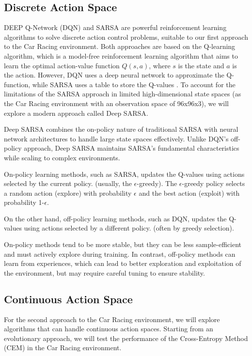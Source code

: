 \documentclass[../CSC_52081_EP.tex]{subfiles}
\begin{document}
    \subsection{Discrete Action Space}

    DEEP Q-Network (DQN) and SARSA are powerful reinforcement learning algorithms to solve discrete action control problems, suitable to our first approach to the Car Racing environment.
    Both approaches are based on the Q-learning algorithm, which is a model-free reinforcement learning algorithm that aims to learn the optimal action-value function $Q(s, a)$, where $s$ is the state and $a$ is the action.
    However, DQN uses a deep neural network to approximate the Q-function, while SARSA uses a table to store the Q-values \cite{Popular_RL}. To account for the limitations of the SARSA approach in limited high-dimensional state spaces (as the Car Racing environment with an observation space of 96x96x3), we will explore a modern approach called Deep SARSA. \cite{Deep_SARSA}

    Deep SARSA combines the on-policy nature of traditional SARSA with neural network architectures to handle large state spaces effectively. Unlike DQN's off-policy approach, Deep SARSA maintains SARSA's fundamental characteristics while scaling to complex environments.

    On-policy learning methods, such as SARSA, updates the Q-values using actions selected by the current policy. (usually, the $\epsilon$-greedy).
    The $\epsilon$-greedy policy selects a random action (explore) with probability $\epsilon$ and the best action (exploit) with probability 1-$\epsilon$.

    On the other hand, off-policy learning methods, such as DQN, updates the Q-values using actions selected by a different policy. (often by greedy selection).

    On-policy methods tend to be more stable, but they can be less sample-efficient and must actively explore during training. In contrast, off-policy methods can learn from experiences, which can lead to better exploration and exploitation of the environment, but may require careful tuning to ensure stability.

    \subsection{Continuous Action Space}

    For the second approach to the Car Racing environment, we will explore algorithms that can handle continuous action spaces.
    Starting from an evolutionary approach, we will test the performance of the Cross-Entropy Method (CEM) in the Car Racing environment.
\end{document}
